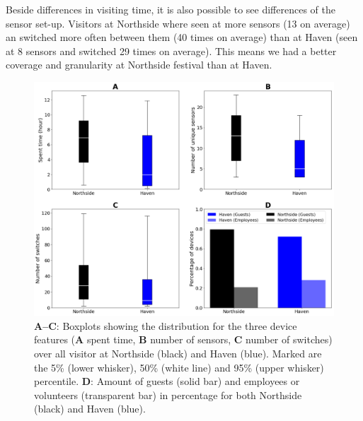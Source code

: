 Beside differences in visiting time, it is also possible to see differences of the sensor set-up. Visitors at Northside where seen at more sensors (13 on average) an switched more often between them (40 times on average) than at Haven (seen at 8 sensors and switched 29 times on average). This means we had a better coverage and granularity at Northside festival than at Haven.

\begin{figure}[tb]
  \centering
  \includegraphics[width=\linewidth]{figs/features_boxplot.png}
  \caption{\textbf{A--C}: Boxplots showing the distribution for the three device features (\textbf{A} spent time, \textbf{B} number of sensors, \textbf{C} number of switches) over all visitor at Northside (black) and Haven (blue). Marked are the 5\% (lower whisker), 50\% (white line) and 95\% (upper whisker) percentile. \textbf{D}: Amount of guests (solid bar) and employees or volunteers (transparent bar) in percentage for both Northside (black) and Haven (blue).}
  \label{fig:features}
\end{figure}